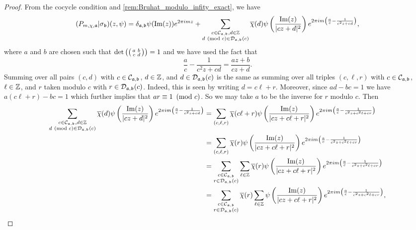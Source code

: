 \documentclass[12pt,oneside]{book}
\begin{document}
    \begin{proof}
      From the cocycle condition and \cref{rem:Bruhat_modulo_infity_exact}, we have
      \[
        (P_{m,\chi,\mathfrak{a}}|\sigma_{\mathfrak{b}})(z,\psi) = \delta_{\mathfrak{a},\mathfrak{{b}}}\psi(\mathrm{Im}(z))e^{2\pi imz}+\sum_{\substack{c \in \mathcal{C}_{\mathfrak{a},\mathfrak{b}}, d \in \mathbb{Z} \\ d \ \left(\text{mod }c\right) \in \mathcal{D}_{\mathfrak{a},\mathfrak{b}}(c)}}\overline{\chi}(d)\psi\left(\frac{\mathrm{Im}(z)}{|cz+d|^{2}}\right)e^{2\pi im\left(\frac{a}{c}-\frac{1}{c^{2}z+cd}\right)},
      \]
      where $a$ and $b$ are chosen such that $\det\left(\begin{psmallmatrix} a & b \\ c & d \end{psmallmatrix}\right) = 1$ and we have used the fact that
      \[
        \frac{a}{c}-\frac{1}{c^{2}z+cd} = \frac{az+b}{cz+d}.
      \]
      Summing over all pairs $(c,d)$ with $c \in \mathcal{C}_{\mathfrak{a},\mathfrak{b}}$, $d \in \mathbb{Z}$, and $d \in \mathcal{D}_{\mathfrak{a},\mathfrak{b}}(c)$ is the same as summing over all triples $(c,\ell,r)$ with $c \in \mathcal{C}_{\mathfrak{a},\mathfrak{b}}$, $\ell \in \mathbb{Z}$, and $r$ taken modulo $c$ with $r \in \mathcal{D}_{\mathfrak{a},\mathfrak{b}}(c)$. Indeed, this is seen by writing $d = c\ell+r$. Moreover, since $ad-bc = 1$ we have $a(c\ell+r)-bc = 1$ which further implies that $ar \equiv 1 \ \left(\text{mod }c\right)$. So we may take $a$ to be the inverse for $r$ modulo $c$. Then
      \begin{align*}
        \sum_{\substack{c \in \mc{C}_{\mf{a},\mf{b}}, d \in \Z \\ d \tmod{c} \in \mc{D}_{\mf{a},\mf{b}}(c)}}\cchi(d)\psi\left(\frac{\Im(z)}{|cz+d|^{2}}\right)e^{2\pi im\left(\frac{a}{c}-\frac{1}{c^{2}z+cd}\right)} &= \sum_{(c,\ell,r)}\cchi(c\ell+r)\psi\left(\frac{\Im(z)}{|cz+c\ell+r|^{2}}\right)e^{2\pi im\left(\frac{a}{c}-\frac{1}{c^{2}z+c^{2}\ell+cr}\right)} \\
        &= \sum_{(c,\ell,r)}\cchi(r)\psi\left(\frac{\Im(z)}{|cz+c\ell+r|^{2}}\right)e^{2\pi im\left(\frac{a}{c}-\frac{1}{c^{2}z+c^{2}\ell+cr}\right)} \\
        &= \sum_{\substack{c \in \mc{C}_{\mf{a},\mf{b}} \\ r \in \mc{D}_{\mf{a},\mf{b}}(c)}}\sum_{\ell \in \Z}\cchi(r)\psi\left(\frac{\Im(z)}{|cz+c\ell+r|^{2}}\right)e^{2\pi im\left(\frac{a}{c}-\frac{1}{c^{2}z+c^{2}\ell+cr}\right)} \\
        &= \sum_{\substack{c \in \mc{C}_{\mf{a},\mf{b}} \\ r \in \mc{D}_{\mf{a},\mf{b}}(c)}}\cchi(r)\sum_{\ell \in \Z}\psi\left(\frac{\Im(z)}{|cz+c\ell+r|^{2}}\right)e^{2\pi im\left(\frac{a}{c}-\frac{1}{c^{2}z+c^{2}\ell+cr}\right)},

\end{align*}
\end{proof}
\end{document}
